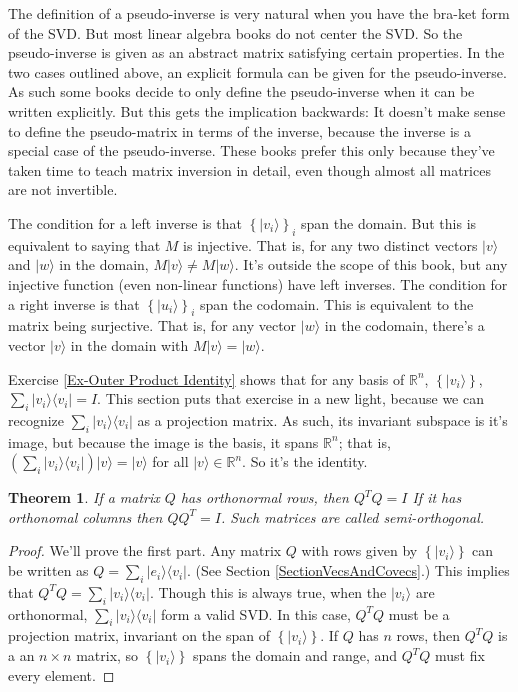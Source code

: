 \documentclass{amsbook}
\newtheorem{theorem}{Theorem}
\begin{document}
The definition of a pseudo-inverse is very natural when you have the bra-ket form of the SVD.  But most linear algebra books do not center the SVD.  So the pseudo-inverse is given as an abstract matrix satisfying certain properties.  In the two cases outlined above, an explicit formula can be given for the pseudo-inverse.  As such some books decide to only define the pseudo-inverse when it can be written explicitly.  But this gets the implication backwards: It doesn't make sense to define the pseudo-matrix in terms of the inverse, because the inverse is a special case of the pseudo-inverse.  These books prefer this only because they've taken time to teach matrix inversion in detail, even though almost all matrices are not invertible.

The condition for a left inverse is that $\left\{|v_i\rangle\right\}_i$ span the domain.  But this is equivalent to saying that $M$ is injective.  That is, for any two distinct vectors $|v\rangle$ and $|w\rangle$ in the domain, $M|v\rangle\neq M|w\rangle$.  It's outside the scope of this book, but any injective function (even non-linear functions) have left inverses.  The condition for a right inverse is that $\left\{|u_i\rangle\right\}_i$ span the codomain.  This is equivalent to the matrix being surjective.  That is, for any vector $|w\rangle$ in the codomain, there's a vector $|v\rangle$ in the domain with $M|v\rangle=|w\rangle$.

Exercise \ref{Ex-Outer Product Identity} shows that for any basis of $\mathbb R^n$, $\left\{|v_i\rangle\right\}$, $\sum_i|v_i\rangle\langle v_i|=I$.  This section puts that exercise in a new light, because we can recognize $\sum_i|v_i\rangle\langle v_i|$ as a projection matrix.  As such, its invariant subspace is it's image, but because the image is the basis, it spans $\mathbb R^n$; that is, $\left(\sum_i|v_i\rangle\langle v_i|\right)|v\rangle=|v\rangle$ for all $|v\rangle\in\mathbb R^n$.  So it's the identity.

\begin{theorem}
If a matrix $Q$ has orthonormal rows, then $Q^TQ=I$  If it has orthonomal columns then $QQ^T=I$.  Such matrices are called {\em semi-orthogonal}.
\end{theorem}

\begin{proof}
We'll prove the first part.  Any matrix $Q$ with rows given by $\left\{|v_i\rangle\right\}$ can be written as $Q=\sum_i|e_i\rangle\langle v_i|$.  (See Section \ref{SectionVecsAndCovecs}.)  This implies that $Q^TQ=\sum_i|v_i\rangle\langle v_i|$.  Though this is always true, when the $|v_i\rangle$ are orthonormal, $\sum_i|v_i\rangle\langle v_i|$ form a valid SVD.  In this case, $Q^TQ$ must be a projection matrix, invariant on the span of $\left\{|v_i\rangle\right\}$.  If $Q$ has $n$ rows, then $Q^TQ$ is a an $n\times n$ matrix, so $\left\{|v_i\rangle\right\}$ spans the domain and range, and $Q^TQ$ must fix every element.
\end{proof}
\end{document}
